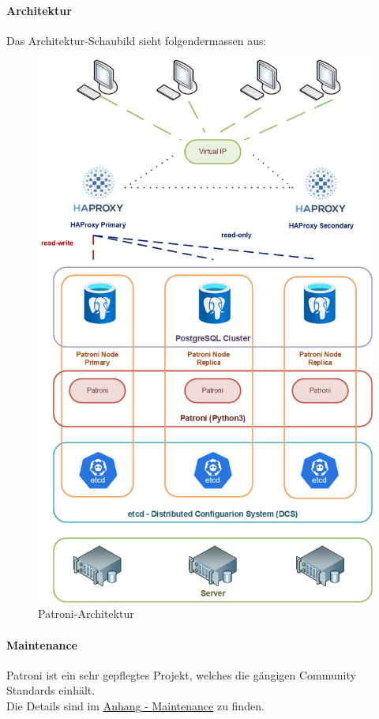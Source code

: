\begin{flushleft}
    \paragraph{Architektur}
    Das Architektur-Schaubild sieht folgendermassen aus:
    \begin{figure}[H]
        \centering
        \includegraphics[width=0.7\linewidth]{source/implementation/evaluation/postgresql_ha_solutions/patroni_architecture}
        \caption{Patroni-Architektur}
        \label{fig:patroni-architecture}
    \end{figure}
\end{flushleft}
\begin{flushleft}
    \paragraph{Maintenance}
    Patroni ist ein sehr gepflegtes Projekt, welches die gängigen Community Standards einhält.\\
    Die Details sind im \hyperref[subsec:maintenance_patroni]{Anhang - Maintenance} zu finden.
\end{flushleft}
